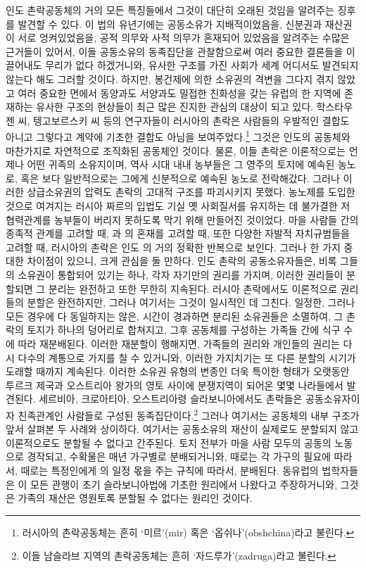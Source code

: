 인도 촌락공동체의 거의 모든 특징들에서
그것이 대단히 오래된 것임을 알려주는 징후를 발견할 수 있다.
이 법의 유년기에는 공동소유가 지배적이었음을,
신분권과 재산권이 서로 엉켜있었음을,
공적 의무와 사적 의무가 혼재되어 있었음을 알려주는
수많은 근거들이 있어서,
이들 공동소유의 동족집단을 관찰함으로써 여러 중요한 결론들을
이끌어내도 무리가 없다 하겠거니와,
유사한 구조를 가진 사회가 세계 어디서도 발견되지 않는다 해도 그러할 것이다.
하지만,
봉건제에 의한 소유권의 격변을 그다지 겪지 않았고
여러 중요한 면에서 동양과도 서양과도 밀접한 친화성을 갖는
유럽의 한 지역에 존재하는 유사한 구조의 현상들이
최근 많은 진지한 관심의 대상이 되고 있다.
학스타우젠 씨,
텡고보르스키 씨 등의 연구자들이
러시아의 촌락은 사람들의 우발적인 결합도 아니고
그렇다고 계약에 기초한 결합도 아님을 보여주었다.\footnote{%
  러시아의 촌락공동체는 흔히 `미르'(mir) 혹은 `옵쉬나'(obshchina)라고 불린다. }
그것은 인도의 공동체와 마찬가지로 자연적으로 조직화된 공동체인 것이다.
물론,
이들 촌락은 이론적으로는 언제나 어떤 귀족의 소유지이며,
역사 시대 내내
농부들은
그 영주의 토지에 예속된 농노로,
혹은 보다 일반적으로는
그에게 신분적으로 예속된 농노로 전락해갔다.
그러나
이러한 상급소유권의 압력도
촌락의 고대적 구조를 파괴시키지 못했다.
농노제를 도입한 것으로 여겨지는 러시아 짜르의 입법도
기실 옛 사회질서를 유지하는 데 불가결한 저 협력관계를
농부들이 버리지 못하도록 막기 위해 만들어진 것이었다.
마을 사람들 간의 종족적 관계를 고려할 때,
과 의 혼재를 고려할 때,
또한 다양한 자발적 자치규범들을 고려할 때,
러시아의 촌락은 인도 의 거의 정확한 반복으로 보인다.
그러나 한 가지 중대한 차이점이 있으니,
크게 관심을 둘 만하다.
인도 촌락의 공동소유자들은,
비록 그들의 소유권이 통합되어 있기는 하나,
각자 자기만의 권리를 가지며,
이러한 권리들이 분할되면 그 분리는 완전하고 또한 무한히 지속된다.
러시아 촌락에서도 이론적으로 권리들의 분할은 완전하지만,
그러나 여기서는 그것이 일시적인 데 그친다.
일정한, 그러나 모든 경우에 다 동일하지는 않은,
시간이 경과하면
분리된 소유권들은 소멸하여,
그 촌락의 토지가 하나의 덩어리로 합쳐지고, 그후
공동체를 구성하는 가족들 간에 식구 수에 따라 재분배된다.
이러한 재분할이 행해지면,
가족들의 권리와 개인들의 권리는 다시
다수의 계통으로 가지를 칠 수 있거니와,
이러한 가지치기는 또 다른 분할의 시기가 도래할 때까지 계속된다.
이러한 소유권 유형의 변종인 더욱 특이한 형태가
오랫동안
투르크 제국과 오스트리아 왕가의 영토 사이에 분쟁지역이 되어온
몇몇 나라들에서 발견된다.
세르비아, 크로아티아, 오스트리아령 슬라보니아에서도
촌락들은 공동소유자이자 친족관계인 사람들로 구성된 동족집단이다.\footnote{%
  이들 남슬라브 지역의 촌락공동체는 흔히 `자드루가'(zadruga)라고 불린다. }
그러나 여기서는 공동체의 내부 구조가
앞서 살펴본 두 사례와 상이하다.
여기서는 공동소유의 재산이 실제로도 분할되지 않고
이론적으로도 분할될 수 없다고 간주된다.
토지 전부가 마을 사람 모두의 공동의 노동으로 경작되고,
수확물은 매년 가구별로 분배되거니와,
때로는 각 가구의 필요에 따라서,
때로는 특정인에게 의 일정 몫을 주는 규칙에 따라서,
분배된다.
동유럽의 법학자들은 이 모든 관행이
초기 슬라보니아법에 기초한 원리에서 나왔다고 주장하거니와,
그것은 가족의 재산은 영원토록 분할될 수 없다는 원리인 것이다.

